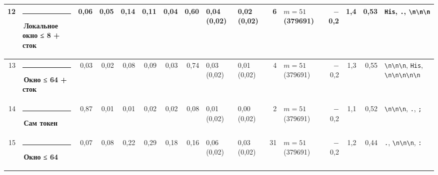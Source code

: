 \documentclass[10pt]{article}
\begin{document}
\begin{minipage}{\linewidth}
\begin{center}
{\begin{tabular}{|r|l|r|r|r|r|r|r|l|l|r|l|r|r|r|l|}
12 & \textcolor[HTML]{1BAF7A}{\rule{0.62em}{0.62em}}\,\textbf{Локальное окно ≤ 8 + сток} & 0,06 & 0,05 & 0,14 & 0,11 & 0,04 & 0,60 & 0,04 (0,02) & 0,02 (0,02) & 6 & $m{=}51$ (379691) & $-$0,2 & 1,4 & 0,53 & \texttt{\textvisiblespace{}His}, \texttt{\textvisiblespace{}.}, \texttt{\textvisiblespace{}\textbackslash{}n\textbackslash{}n\textbackslash{}n} \\ \hline
13 & \textcolor[HTML]{EDA100}{\rule{0.62em}{0.62em}}\,\textbf{Окно ≤ 64 + сток} & 0,03 & 0,02 & 0,08 & 0,09 & 0,03 & 0,74 & 0,03 (0,02) & 0,01 (0,02) & 4 & $m{=}51$ (379691) & $-$0,2 & 1,3 & 0,55 & \texttt{\textvisiblespace{}\textbackslash{}n\textbackslash{}n\textbackslash{}n}, \texttt{\textvisiblespace{}His}, \texttt{\textvisiblespace{}\textbackslash{}n\textbackslash{}n\textbackslash{}n\textbackslash{}n\textbackslash{}n} \\ \hline
14 & \textcolor[HTML]{2A78D6}{\rule{0.62em}{0.62em}}\,\textbf{Сам токен} & 0,87 & 0,01 & 0,01 & 0,02 & 0,02 & 0,08 & 0,01 (0,02) & 0,00 (0,02) & 2 & $m{=}51$ (379691) & $-$0,2 & 1,1 & 0,52 & \texttt{\textvisiblespace{}\textbackslash{}n\textbackslash{}n\textbackslash{}n}, \texttt{\textvisiblespace{}.}, \texttt{\textvisiblespace{};} \\ \hline
15 & \textcolor[HTML]{EDA100}{\rule{0.62em}{0.62em}}\,\textbf{Окно ≤ 64} & 0,07 & 0,08 & 0,22 & 0,29 & 0,18 & 0,16 & 0,06 (0,02) & 0,03 (0,02) & 31 & $m{=}51$ (379691) & $-$0,2 & 1,2 & 0,44 & \texttt{\textvisiblespace{}.}, \texttt{\textvisiblespace{}\textbackslash{}n\textbackslash{}n\textbackslash{}n}, \texttt{\textvisiblespace{}:} \\ \hline
\hline\end{tabular}}\end{center}
\end{minipage}
\par\vspace{0.4em}
\end{document}
